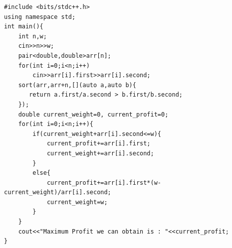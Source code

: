 \documentclass[10pt]{article}
\begin{document}
\begin{lstlisting}
#include <bits/stdc++.h>
using namespace std;
int main(){
    int n,w;
    cin>>n>>w;
    pair<double,double>arr[n];
    for(int i=0;i<n;i++)
        cin>>arr[i].first>>arr[i].second;
    sort(arr,arr+n,[](auto a,auto b){
       return a.first/a.second > b.first/b.second; 
    });
    double current_weight=0, current_profit=0;
    for(int i=0;i<n;i++){
        if(current_weight+arr[i].second<=w){
            current_profit+=arr[i].first;
            current_weight+=arr[i].second;
        }
        else{
            current_profit+=arr[i].first*(w-current_weight)/arr[i].second;
            current_weight=w;
        }
    }
    cout<<"Maximum Profit we can obtain is : "<<current_profit;
}
\end{lstlisting}
\clearpage

	
\end{document}

